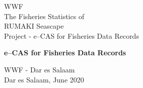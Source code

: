 \begin{titlepage}
\vspace * {-2.5cm}	
	WWF\\
	The Fisheries Statistics of\\
	RUMAKI Seascape\\
	Project - e--CAS for Fisheries Data Records
	
\begin{center}

\vspace * {5cm}
\huge \textbf{e--CAS for Fisheries Data Records}

%
%


\vspace * {2cm}

\large
WWF - Dar es Salaam\\ 

\large
Dar es Salaam, June 2020\\ 


\end{center}


\end{titlepage}


